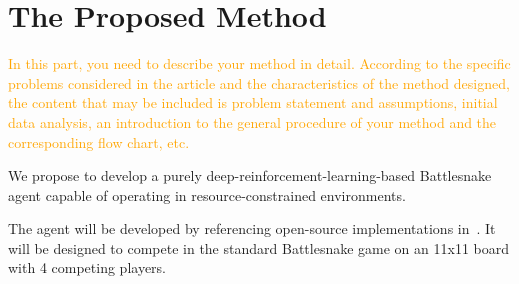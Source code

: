 \documentclass[conference]{IEEEtran}
\newcommand{\instruction}[1]{\textcolor{orange}{#1}}
\begin{document}
\section{The Proposed Method}

\instruction{In this part, you need to describe your method in detail.
    According to the specific problems considered in the article and the
    characteristics of the method designed,
    the content that may be included is problem statement and assumptions,
    initial data analysis,
    an introduction to the general procedure of your method and the
    corresponding flow chart, etc.
}

We propose to develop a purely deep-reinforcement-learning-based Battlesnake
agent capable of operating in resource-constrained environments.

The agent will be developed by referencing open-source implementations
in~\cite{siddiqui2020multiagent,chung2020battlesnake,wrenger2024rusty}.
It will be designed to compete in the standard Battlesnake game on an 11x11
board with 4 competing players.
\end{document}
